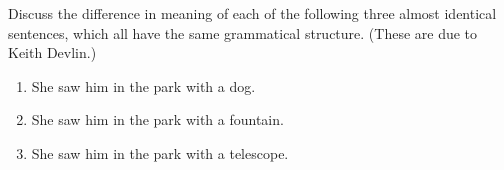 Discuss the difference in meaning of each of the following three almost identical sentences, which all have the same grammatical structure.  (These are due to Keith Devlin.)
\begin{enumerate}
\item She saw him in the park with a dog.
\item She saw him in the park with a fountain.
\item She saw him in the park with a telescope.
\end{enumerate}